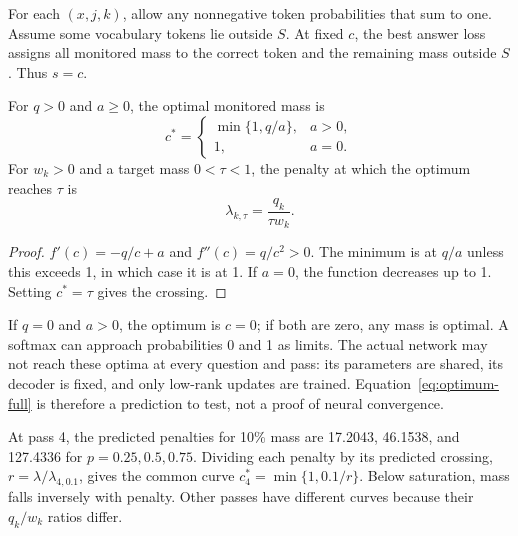 For each $(x,j,k)$, allow any nonnegative token probabilities that sum to one. Assume some vocabulary tokens lie outside $S$. At fixed $c$, the best answer loss assigns all monitored mass to the correct token and the remaining mass outside $S$. Thus $s=c$.
\begin{proposition}
For $q>0$ and $a\ge0$, the optimal monitored mass is
\begin{equation}
 c^*=\begin{cases}\min\{1,q/a\},&a>0,\\1,&a=0.\end{cases}
 \label{eq:optimum-full}
\end{equation}
For $w_k>0$ and a target mass $0<\tau<1$, the penalty at which the optimum reaches $\tau$ is
\begin{equation}
 \lambda_{k,\tau}=\frac{q_k}{\tau w_k}.
 \label{eq:threshold}
\end{equation}
\end{proposition}
\begin{proof}
$f'(c)=-q/c+a$ and $f''(c)=q/c^2>0$. The minimum is at $q/a$ unless this exceeds 1, in which case it is at 1. If $a=0$, the function decreases up to 1. Setting $c^*=\tau$ gives the crossing.
\end{proof}
If $q=0$ and $a>0$, the optimum is $c=0$; if both are zero, any mass is optimal. A softmax can approach probabilities 0 and 1 as limits. The actual network may not reach these optima at every question and pass: its parameters are shared, its decoder is fixed, and only low-rank updates are trained. Equation~\eqref{eq:optimum-full} is therefore a prediction to test, not a proof of neural convergence.

At pass 4, the predicted penalties for 10\% mass are 17.2043, 46.1538, and 127.4336 for $p=0.25,0.5,0.75$. Dividing each penalty by its predicted crossing, $r=\lambda/\lambda_{4,0.1}$, gives the common curve $c_4^*=\min\{1,0.1/r\}$. Below saturation, mass falls inversely with penalty. Other passes have different curves because their $q_k/w_k$ ratios differ.

